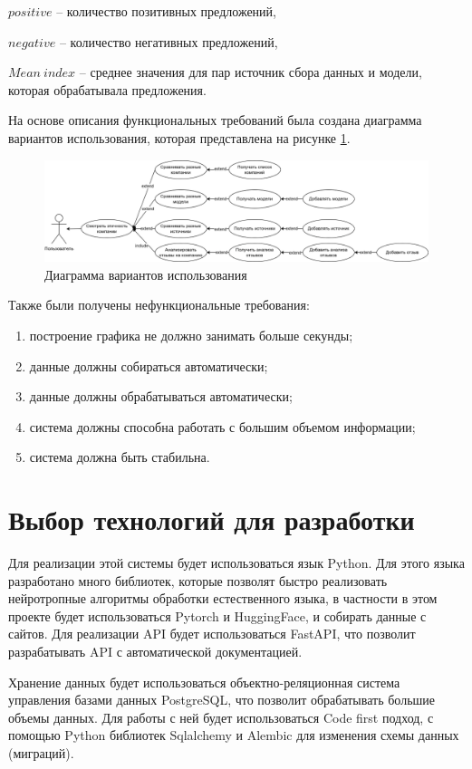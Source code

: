 \documentclass[PI, VKR]{HSEUniversity}
\begin{document}
\(positive\) -- количество позитивных предложений,

\(negative\) -- количество негативных предложений,

\(Mean\ index\) -- среднее значения для пар источник сбора данных и модели, которая обрабатывала предложения.

На основе описания функциональных требований была создана диаграмма вариантов использования, которая представлена на рисунке \ref{fig:usecasefull}.
\begin{figure}[h!]
\centering
\includegraphics[width=\textwidth]{img/use-case.png}
\caption{\label{fig:usecasefull}Диаграмма вариантов использования}
\end{figure}

Также были получены нефункциональные требования:
\begin{enumerate}
\item построение графика не должно занимать больше секунды;
\item данные должны собираться автоматически;
\item данные должны обрабатываться автоматически;
\item система должны способна работать с большим объемом информации;
\item система должна быть стабильна.
\end{enumerate}
\section{Выбор технологий для разработки}
\label{sec:orgf42eefc}
Для реализации этой системы будет использоваться язык Python. Для этого языка разработано много библиотек, которые позволят быстро реализовать нейротропные алгоритмы обработки естественного языка, в частности в этом проекте будет использоваться Pytorch\autocite{paszke_pytorch_2019} и HuggingFace\autocite{wolf_transformers_2020}, и собирать данные с сайтов. Для реализации API будет использоваться FastAPI, что позволит разрабатывать API с автоматической документацией.

Хранение данных будет использоваться объектно-реляционная система управления базами данных PostgreSQL, что позволит обрабатывать большие объемы данных. Для работы с ней будет использоваться Code first подход, с помощью Python библиотек Sqlalchemy и Alembic для изменения схемы данных (миграций).
\end{document}
